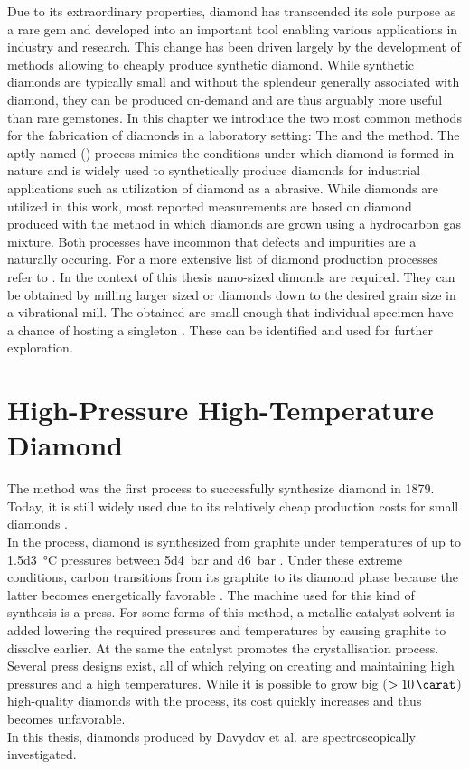 	Due to its extraordinary properties, diamond has transcended its sole purpose as a rare gem and developed into an important tool enabling various applications in industry and research. This change has been driven largely by the development of methods allowing to cheaply produce synthetic diamond. While synthetic diamonds are typically small and without the splendeur generally associated with diamond, they can be produced on-demand and are thus arguably more useful than rare gemstones.
	In this chapter we introduce the two most common methods for the fabrication of diamonds in a laboratory setting: The \hpht and the \cvd method.
	The aptly named \hpht (\HPHT) process mimics the conditions under which diamond is formed in nature and is widely used to synthetically produce diamonds for industrial applications such as utilization of diamond as a abrasive.
	While \HPHT diamonds are utilized in this work, most reported measurements are based on diamond produced with the \CVD method in which diamonds are grown using a hydrocarbon gas mixture. Both processes have incommon that defects and impurities are a naturally occuring.
	For a more extensive list of diamond production processes refer to \cite{davis1993diamond}.
	In the context of this thesis nano-sized dimonds are required. They can be obtained by milling larger sized \HPHT or \CVD diamonds down to the desired grain size in a vibrational mill.
	The obtained \nds are small enough that individual specimen have a chance of hosting a singleton \siv. These can be identified and used for further exploration.

\section[HPHT]{High-Pressure High-Temperature Diamond}\label{sec::hpht}

	The \HPHT method was the first process to successfully synthesize diamond in 1879.
	Today, it is still widely used due to its relatively cheap production costs for small diamonds \cite{wikiSyntheticDiamond}.
	\\
	In the \HPHT process, diamond is synthesized from graphite under temperatures of up to \SI{1.5d3}{\celsius} pressures between \SI{5d4}{bar} and \SI{d6}{bar} \cite{davis1993diamond}. Under these extreme conditions, carbon transitions from its graphite to its diamond phase because the latter becomes energetically favorable \cite{janine::135, janine::136, janine::137, janine::138}.
	The machine used for this kind of synthesis is a press.
	For some forms of this method, a metallic catalyst solvent is added lowering the required pressures and temperatures by causing graphite to dissolve earlier. At the same the catalyst promotes the crystallisation process.
	Several press designs exist, all of which relying on creating and maintaining high pressures and a high temperatures.
	While it is possible to grow big ($> \SI{10}{\carat}$) high-quality diamonds with the \HPHT process, its cost quickly increases and thus becomes unfavorable.
	\\
	In this thesis, \HPHT \nds diamonds produced by Davydov et al. \cite{Davydov2014} are spectroscopically investigated.


